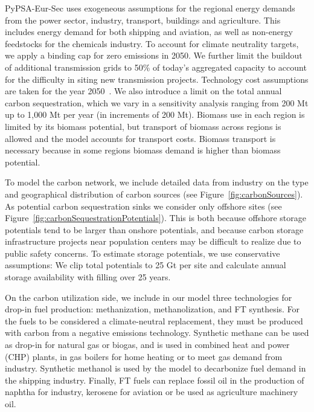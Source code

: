 \documentclass[10pt,5p,reversenotenum,lefttitle]{elsarticle}
\begin{document}
PyPSA-Eur-Sec uses exogeneous assumptions for the regional energy demands from the power sector, industry, transport, buildings and agriculture. This includes energy demand for both shipping and aviation, as well as non-energy feedstocks for the chemicals industry. To account for climate neutrality targets, we apply a binding cap for zero emissions in 2050. We further limit the buildout of additional transmission grids to 50\% of today's aggregated capacity to account for the difficulty in siting new transmission projects. Technology cost assumptions are taken for the year 2050~\cite{danishenergyagencyTechnologyDataGeneration2019}. We also introduce a limit on the total annual carbon sequestration, which we vary in a sensitivity analysis ranging from 200 Mt up to 1,000 Mt per year (in increments of 200 Mt). Biomass use in each region is limited by its biomass potential, but transport of biomass across regions is allowed and the model accounts for transport costs. Biomass transport is necessary because in some regions biomass demand is higher than biomass potential.

To model the carbon network, we include detailed data from industry on the type and geographical distribution of carbon sources (see Figure~\ref{fig:carbonSources}). As potential carbon sequestration sinks we consider only offshore sites (see Figure~\ref{fig:carbonSequestrationPotentials}). This is both because offshore storage potentials tend to be larger than onshore potentials, and because carbon storage infrastructure projects near population centers may be difficult to realize due to public safety concerns. To estimate storage potentials, we use conservative assumptions: We clip total potentials to 25 Gt per site and calculate annual storage availability with filling over 25 years.

On the carbon utilization side, we include in our model three technologies for drop-in fuel production: methanization, methanolization, and FT synthesis. For the fuels to be considered a climate-neutral replacement, they must be produced with carbon from a negative emissions technology. Synthetic methane can be used as drop-in for natural gas or biogas, and is used in combined heat and power (CHP) plants, in gas boilers for home heating or to meet gas demand from industry. Synthetic methanol is used by the model to decarbonize fuel demand in the shipping industry. Finally, FT fuels can replace fossil oil in the production of naphtha for industry, kerosene for aviation or be used as agriculture machinery oil.
\end{document}
